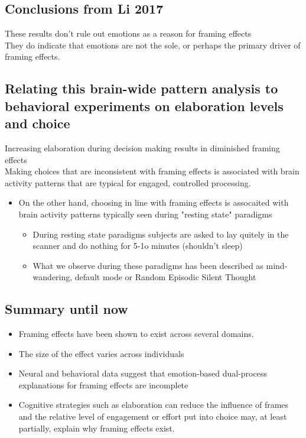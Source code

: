 \subsection{Conclusions from Li 2017}
These results don't rule out emotions as a reason for framing effects
\\They do indicate that emotions are not the sole, or perhaps the primary driver of framing effects.
\subsection{Relating this brain-wide pattern analysis to behavioral experiments on elaboration levels and choice
}
Increasing elaboration during decision making results in diminished framing effects
\\Making choices that are inconsistent with framing effects is associated with brain activity patterns that are typical for engaged, controlled processing.
\begin{itemize}
    \item On the other hand, choosing in line with framing effects is assocaited with brain activity patterns typically seen during "resting state" paradigms
    \begin{itemize}
        \item During resting state paradigms subjects are asked to lay quitely in the scanner and do nothing for 5-1o minutes (shouldn't sleep)
        \item What we observe during these paradigms has been described as mind-wandering, default mode or Random Episodic Silent Thought
    \end{itemize}
\end{itemize}
\subsection{Summary until now}
\begin{itemize}
    \item Framing effects have been shown to exist across several domains.
    \item The size of the effect varies across individuals
    \item Neural and behavioral data suggest that emotion-based dual-process explanations for framing effects are incomplete
    \item Cognitive strategies such as elaboration can reduce the influence of frames and the relative level of engagement or effort put into choice may, at least partially, explain why framing effects exist.
\end{itemize}

